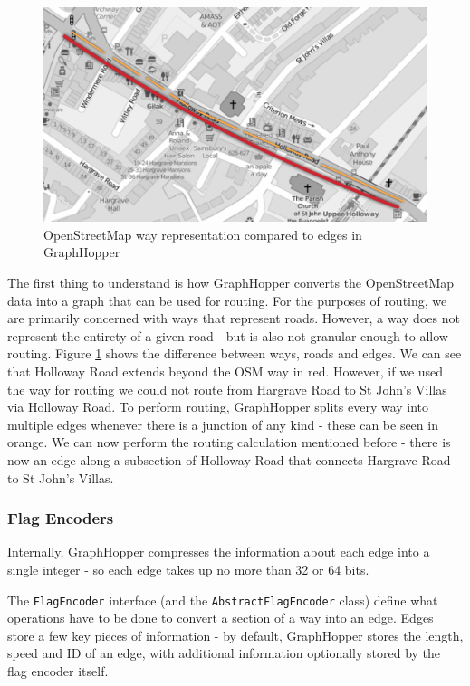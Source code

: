 \documentclass[ %
                    author={Alexander Hill},
                supervisor={Dr. Benjamin Sach},
                    degree={MEng},
                     title={MARMOSET: Multi Agent Real-time Multi-core Online
                     Simulation for Efficient Transportation},
                  subtitle={},
                      type={research},
                      year={2016} ]{dissertation}
\begin{document}
\begin{figure}[p]
    \centering
    \includegraphics[scale=0.6]{osm-gh}
    \caption{OpenStreetMap way representation compared to edges in GraphHopper}\label{fig:osm-gh}
\end{figure}

The first thing to understand is how GraphHopper converts the OpenStreetMap data
into a graph that can be used for routing.
For the purposes of routing, we are primarily concerned with ways that represent
roads. However, a way does not represent the entirety of a given road - but is
also not granular enough to allow routing. Figure \ref{fig:osm-gh} shows the
difference between ways, roads and edges. We can see that Holloway Road extends
beyond the OSM way in red. However, if we used the way for routing we could not
route from Hargrave Road to St John's Villas via Holloway Road. To perform
routing, GraphHopper splits every way into multiple edges whenever there is a
junction of any kind - these can be seen in orange. We can now perform the
routing calculation mentioned before - there is now an edge along a subsection of
Holloway Road that conncets Hargrave Road to St John's Villas.

\subsubsection{Flag Encoders}

Internally, GraphHopper compresses the information about each edge into a
single integer - so each edge takes up no more than 32 or 64 bits.

The \texttt{FlagEncoder} interface (and the \texttt{AbstractFlagEncoder} class) define what
operations have to be done to convert a section of a way into an edge. Edges
store a few key pieces of information - by default, GraphHopper stores the
length, speed and ID of an edge, with additional information optionally stored
by the flag encoder itself.
\end{document}
